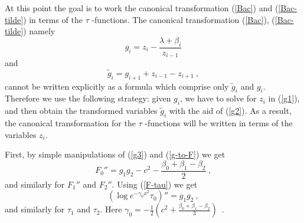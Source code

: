 \documentclass[a4paper,11pt]{article}
\begin{document}
At this point the goal is to work the canonical transformation (\ref{Bac}) and
(\ref{Bac-tilde}) in terms of the $\tau$ -functions.
The canonical transformation (\ref{Bac}), (\ref{Bac-tilde}) namely
\begin{equation}
\label{g1}
g_i = z_i - \frac{\lambda + \beta_i}{z_{i-1}}
\end{equation}
and
\begin{equation}
\label{g2} \tilde{g}_i = g_{i+1} + z_{i-1} -z_{i+1}~,
\end{equation}
cannot be written explicitly as a formula which comprise only $\tilde{g}_i$ and
$g_i$. Therefore we use the following strategy: given $g_i$, we have to solve
for $z_i$ in (\ref{g1}), and then obtain the transformed variables $\tilde{g}_i$
with the aid of (\ref{g2}). As a result, the canonical transformation for the
$\tau$ -functions will be written in terms of the variables $z_i$.

First, by simple manipulations of (\ref{g3}) and (\ref{g-to-F}) we get
\begin{equation}
\label{F0} F_0'' = g_1 g_2 - c^2 - \frac{\beta_0 + \beta_1 - \beta_2}{2}~,
\end{equation}
and similarly for $F_1''$ and $F_2''$. Using (\ref{F-tau}) we get
\begin{equation}
\label{log-tau}
\left( \log e^{-\gamma_0 x^2} \tau_0 \right)'' = g_1 g_2~,
\end{equation}
and similarly for $\tau_1$ and $\tau_2$. Here
$\gamma_0 = -\frac{1}{2} \left(c^2 + \frac{\beta_0 +\beta_1 -\beta_2}{3}\right)$~.
\end{document}
